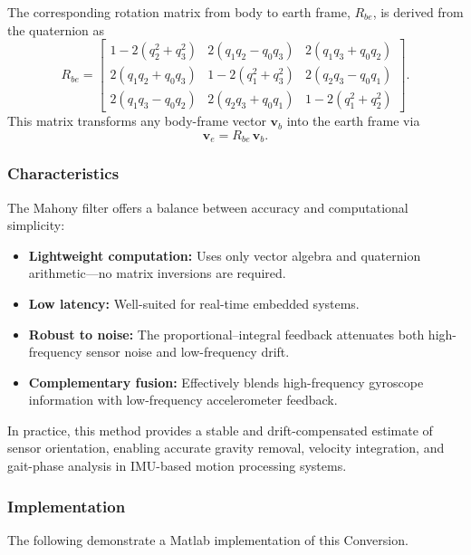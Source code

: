 \documentclass[10pt]{article}
\begin{document}
The corresponding rotation matrix from body to earth frame, \(R_{be}\), is derived from the quaternion as
\begin{equation}
R_{be} =
\begin{bmatrix}
1-2(q_2^2+q_3^2) & 2(q_1q_2-q_0q_3) & 2(q_1q_3+q_0q_2)\\
2(q_1q_2+q_0q_3) & 1-2(q_1^2+q_3^2) & 2(q_2q_3-q_0q_1)\\
2(q_1q_3-q_0q_2) & 2(q_2q_3+q_0q_1) & 1-2(q_1^2+q_2^2)
\end{bmatrix}.
\end{equation}
This matrix transforms any body-frame vector \(\mathbf{v}_b\) into the earth frame via
\begin{equation}
\mathbf{v}_e = R_{be}\,\mathbf{v}_b.
\end{equation}

\subsubsection{Characteristics}

The Mahony filter offers a balance between accuracy and computational simplicity:
\begin{itemize}
    \item \textbf{Lightweight computation:} Uses only vector algebra and quaternion arithmetic—no matrix inversions are required.
    \item \textbf{Low latency:} Well-suited for real-time embedded systems.
    \item \textbf{Robust to noise:} The proportional–integral feedback attenuates both high-frequency sensor noise and low-frequency drift.
    \item \textbf{Complementary fusion:} Effectively blends high-frequency gyroscope information with low-frequency accelerometer feedback.
\end{itemize}

In practice, this method provides a stable and drift-compensated estimate of sensor orientation, enabling accurate gravity removal, velocity integration, and gait-phase analysis in IMU-based motion processing systems.

\subsubsection{Implementation}
The following demonstrate a Matlab implementation of this Conversion.
\end{document}
